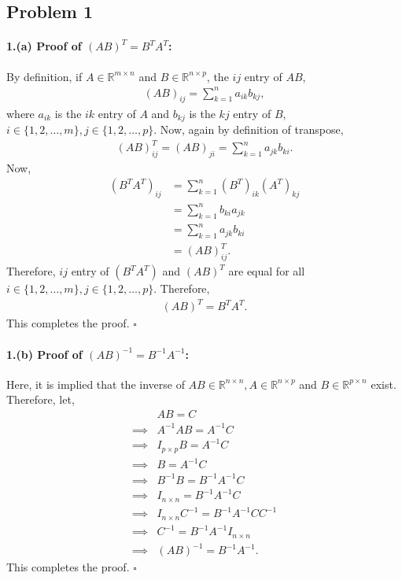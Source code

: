 \subsection*{Problem 1}
\paragraph{1.(a) Proof of $(AB)^T = B^TA^T$:}By definition, if $A \in \mathbb{R}^{m\times n}$ and $B \in \mathbb{R}^{n \times p}$, the $ij$ entry of $AB$,
\begin{align*}
	(AB)_{ij} = \sum_{k=1}^{n}a_{ik}b_{kj},
\end{align*}
where $a_{ik}$ is the $ik$ entry of $A$ and $b_{kj}$ is the $kj$ entry of $B$, $i \in \{1,2,\ldots,m\}, j \in \{1,2,\ldots,p\}$. Now, again by definition of transpose,
\begin{align*}
	(AB)^T_{ij} = (AB)_{ji} = \sum_{k=1}^{n} a_{jk}b_{ki}.
\end{align*}
Now,
\begin{align*}
	(B^TA^T)_{ij} &= \sum_{k=1}^{n}(B^T)_{ik}(A^T)_{kj}\\
	&= \sum_{k=1}^{n} b_{ki}a_{jk}\\
	&= \sum_{k=1}^{n}a_{jk}b_{ki} \\
	&= (AB)^T_{ij}.
\end{align*}
Therefore, $ij$ entry of $(B^TA^T)$ and $(AB)^T$ are equal for all $i \in \{1,2,\ldots,m\}, j \in \{1,2,\ldots,p\}$. Therefore,
\begin{align*}
	(AB)^T = B^TA^T.
\end{align*}
This completes the proof. $\square$
\paragraph{1.(b) Proof of $(AB)^{-1} = B^{-1}A^{-1}$:} Here, it is implied that the inverse of $AB \in \mathbb{R}^{n\times n}, A \in \mathbb{R}^{n \times p}$ and $B \in \mathbb{R}^{p \times n}$ exist. Therefore, let,
\begin{align*}
	&AB = C\\
	\implies& A^{-1}AB = A^{-1}C\\
	\implies& I_{p\times p}B = A^{-1}C\\
	\implies& B = A^{-1}C\\
	\implies& B^{-1}B = B^{-1}A^{-1}C\\
	\implies& I_{n \times n} = B^{-1}A^{-1}C\\
	\implies& I_{n \times n}C^{-1} = B^{-1}A^{-1}CC^{-1}\\
	\implies& C^{-1} = B^{-1}A^{-1}I_{n \times n}\\
	\implies& (AB)^{-1} = B^{-1}A^{-1}.
\end{align*}
This completes the proof. $\square$

